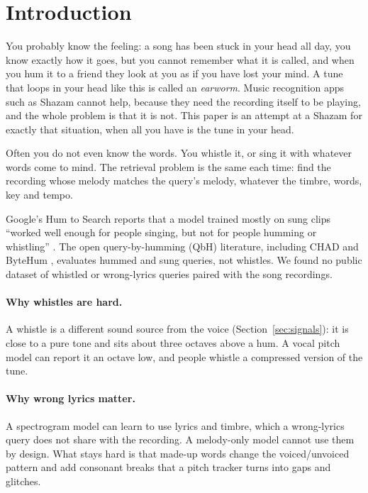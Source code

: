 \documentclass[11pt]{article}
\begin{document}
\section{Introduction}

You probably know the feeling: a song has been stuck in your head all day, you know exactly how it goes, but you cannot remember what it is called, and when you hum it to a friend they look at you as if you have lost your mind. A tune that loops in your head like this is called an \emph{earworm}. Music recognition apps such as Shazam cannot help, because they need the recording itself to be playing, and the whole problem is that it is not. This paper is an attempt at a Shazam for exactly that situation, when all you have is the tune in your head.

Often you do not even know the words. You whistle it, or sing it with whatever words come to mind. The retrieval problem is the same each time: find the recording whose melody matches the query's melody, whatever the timbre, words, key and tempo.

Google's Hum to Search reports that a model trained mostly on sung clips ``worked well enough for people singing, but not for people humming or whistling'' \citep{frank2020hum}. The open query-by-humming (QbH) literature, including CHAD \citep{amatov2023chad} and ByteHum \citep{du2024bytehum}, evaluates hummed and sung queries, not whistles. We found no public dataset of whistled or wrong-lyrics queries paired with the song recordings.

\paragraph{Why whistles are hard.} A whistle is a different sound source from the voice (Section~\ref{sec:signals}): it is close to a pure tone and sits about three octaves above a hum. A vocal pitch model can report it an octave low, and people whistle a compressed version of the tune.

\paragraph{Why wrong lyrics matter.} A spectrogram model can learn to use lyrics and timbre, which a wrong-lyrics query does not share with the recording. A melody-only model cannot use them by design. What stays hard is that made-up words change the voiced/unvoiced pattern and add consonant breaks that a pitch tracker turns into gaps and glitches.
\end{document}
